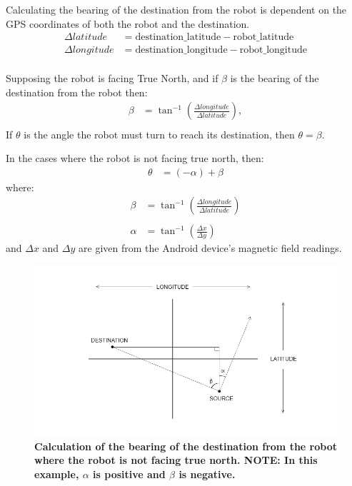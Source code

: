 \documentclass[titlepage,12pt,a4paper]{article}
\begin{document}
Calculating the bearing of the destination from the robot is dependent on the GPS coordinates of both the robot and the destination.
\begin{align*}
	\Delta{latitude}   	&= 	\text{destination\_latitude} - \text{robot\_latitude} \\
	\Delta{longitude}	&= 	\text{destination\_longitude} - \text{robot\_longitude} \\
\end{align*}

Supposing the robot is facing True North, and if $\beta$ is the bearing of the destination from the robot then:
\begin{align*}
	\beta		&=	\tan^{-1}({\frac{\Delta{longitude}}{\Delta{latitude}}}),\\
\end{align*}
If $\theta$ is the angle the robot must turn to reach its destination, then $\theta = \beta$.

\pagebreak

In the cases where the robot is not facing true north, then:
\begin{align*}
	\theta	&=	(-\alpha) + \beta
\end{align*}
where:
\begin{align*}
	\beta		&=	\tan^{-1}({\frac{\Delta{longitude}}{\Delta{latitude}}})\\ \\
	\alpha	&=	\tan^{-1}(\frac{\Delta{x}}{\Delta{y}})
\end{align*}
and $\Delta{x}$ and $\Delta{y}$ are given from the Android device's magnetic field readings.

\begin{figure}[h]
	\centering
	\includegraphics[scale=0.6]{figures/bearingsOffset.png}
	\caption{\textbf{Calculation of the bearing of the destination from the robot where the robot is not facing true north. NOTE: In this example, $\alpha$ is positive and $\beta$ is negative.}}
\end{figure}
\end{document}
